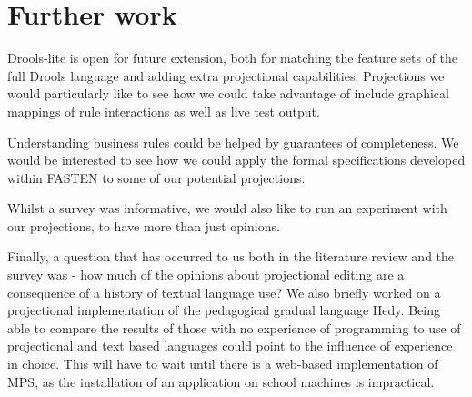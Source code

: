 \section{Further work}

Drools-lite is open for future extension, both for matching the feature sets of the full Drools language and adding extra projectional capabilities.
Projections we would particularly like to see how we could take advantage of include graphical mappings of rule interactions as well as live test output.

Understanding business rules could be helped by guarantees of completeness.
We would be interested to see how we could apply the formal specifications developed within FASTEN\cite{ratiu2019fasten} to some of our potential projections.

Whilst a survey was informative, we would also like to run an experiment with our projections, to have more than just opinions.

Finally, a question that has occurred to us both in the literature review and the survey was - how much of the opinions about projectional editing are a consequence of a history of textual language use?
We also briefly worked on a projectional implementation of the pedagogical gradual language Hedy\cite{hermans2020hedy}.
Being able to compare the results of those with no experience of programming to use of projectional and text based languages could point to the influence of experience in choice.
This will have to wait until there is a web-based implementation of MPS, as the installation of an application on school machines is impractical.
